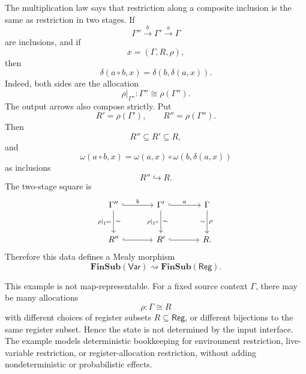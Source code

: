 \begin{example}
    The multiplication law says that restriction along a composite inclusion is the same as restriction in two stages. If
    \[
        \Gamma''
            \xrightarrow{b}
        \Gamma'
            \xrightarrow{a}
        \Gamma
    \]
    are inclusions, and if
    \[
        x=(\Gamma,R,\rho),
    \]
    then
    \[
        \delta(a\circ b,x)
        =
        \delta(b,\delta(a,x)).
    \]
    Indeed, both sides are the allocation
    \[
        \rho|_{\Gamma''}:\Gamma''\cong \rho(\Gamma'').
    \]
    The output arrows also compose strictly. Put
    \[
        R'=\rho(\Gamma'),
        \qquad
        R''=\rho(\Gamma'').
    \]
    Then
    \[
        R''\subseteq R'\subseteq R,
    \]
    and
    \[
        \omega(a\circ b,x)
        =
        \omega(a,x)\circ \omega(b,\delta(a,x))
    \]
    as inclusions
    \[
        R''\hookrightarrow R.
    \]
    The two-stage square is
    \[
        \begin{tikzcd}[column sep=large, row sep=large]
                \Gamma''
                    \arrow[r, hook, "{b}"]
                    \arrow[d, "{\rho|_{\Gamma''}}"', "\sim"]
            &
                \Gamma'
                    \arrow[r, hook, "{a}"]
                    \arrow[d, "{\rho|_{\Gamma'}}"', "\sim"]
            &
                \Gamma
                    \arrow[d, "{\rho}", "\sim"']
            \\
                R''
                    \arrow[r, hook]
            &
                R'
                    \arrow[r, hook]
            &
                R.
        \end{tikzcd}
    \]
    Therefore this data defines a Mealy morphism
    \[
        \mathbf{FinSub}(\mathsf{Var})
        \rightsquigarrow
        \mathbf{FinSub}(\mathsf{Reg}).
    \]
    
    This example is not map-representable. For a fixed source context \(\Gamma\), there may be many allocations
    \[
        \rho:\Gamma\cong R
    \]
    with different choices of register subsets \(R\subseteq\mathsf{Reg}\), or different bijections to the same register subset. Hence the state is not determined by the input interface. The example models deterministic bookkeeping for environment restriction, live-variable restriction, or register-allocation restriction, without adding nondeterministic or probabilistic effects.
\end{example}

